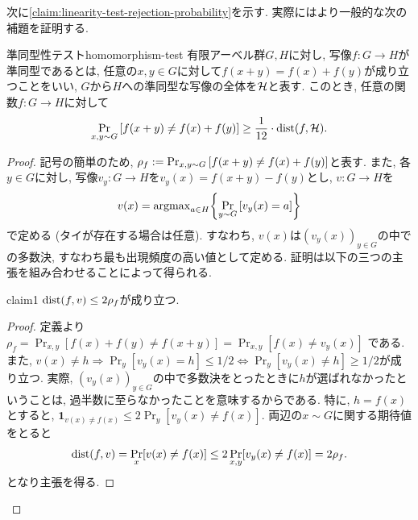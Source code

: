   次に\cref{claim:linearity-test-rejection-probability}を示す.
  実際にはより一般的な次の補題を証明する.
  \begin{lemma}{準同型性テスト}{homomorphism-test}
    有限アーベル群$G,H$に対し, 写像$f\colon G\to H$が準同型であるとは, 任意の$x,y\in G$に対して$f(x+y)=f(x)+f(y)$が成り立つことをいい, $G$から$H$への準同型な写像の全体を$\mathcal{H}$と表す.
    このとき, 任意の関数$f\colon G\to H$に対して
    \begin{align*}
      \Pr_{x,y\sim G}\qty[ f(x+y)\ne f(x)+f(y) ] \ge \frac{1}{12}\cdot \mathrm{dist}(f,\mathcal{H}).
    \end{align*}
  \end{lemma}
  \begin{proof}
    記号の簡単のため, $\rho_f:=\Pr_{x,y\sim G}\qty[ f(x+y)\ne f(x)+f(y) ]$と表す.
    また, 各$y\in G$に対し, 写像$v_y\colon G\to H$を$v_y(x)=f(x+y)-f(y)$とし, $v\colon G\to H$を
    \begin{align*}
      v(x) = \mathrm{argmax}_{a \in H} \qty{ \Pr_{y\sim G}\qty[ v_y(x)=a ] }
    \end{align*}
    で定める (タイが存在する場合は任意).
    すなわち, $v(x)$は$(v_y(x))_{y\in G}$の中での多数決, すなわち最も出現頻度の高い値として定める.
    証明は以下の三つの主張を組み合わせることによって得られる.
    
    \begin{claim}{}{claim1}
      $\mathrm{dist}(f,v) \le 2\rho_f$が成り立つ.
    \end{claim}
    \begin{proof}
      定義より$\rho_f = \Pr_{x,y}[f(x) + f(y) \ne f(x+y)] = \Pr_{x,y} [ f(x) \ne v_y(x)]$ である.
      また, $v(x)\ne h\Rightarrow \Pr_y[v_y(x)= h]\le 1/2 \iff \Pr_y[v_y(x)\ne h]\ge 1/2$が成り立つ.
      実際, $(v_y(x))_{y\in G}$の中で多数決をとったときに$h$が選ばれなかったということは, 過半数に至らなかったことを意味するからである.
      特に, $h=f(x)$とすると, $\mathbf{1}_{v(x)\ne f(x)} \le 2\Pr_y[v_y(x)\ne f(x)]$.
      両辺の$x\sim G$に関する期待値をとると
      \begin{align*}
        \mathrm{dist}(f,v) = \Pr_x[v(x)\ne f(x)] \le 2\Pr_{x,y}[v_y(x)\ne f(x)] =2\rho_f.
      \end{align*}
      となり主張を得る.
    \end{proof}
    

\end{proof}
